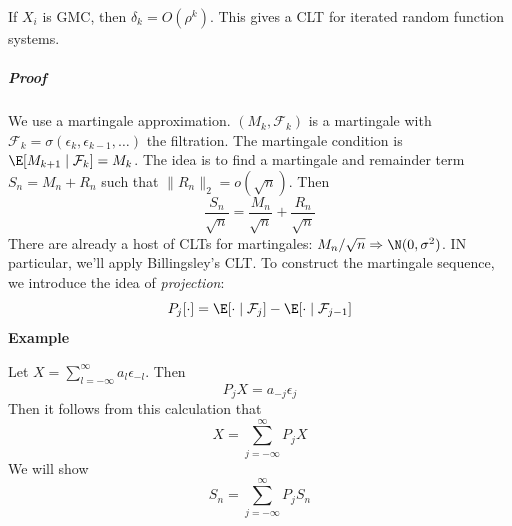 If \(X_i\) is GMC, then \(\delta_k = O(\rho^k)\). This gives a CLT for iterated random function systems.

\subparagraph{Proof}

We use a martingale approximation. \((M_k ,\mathcal F_k)\) is a martingale with \(\mathcal F_k = \sigma(\epsilon_k, \epsilon_{k-1}, \dots)\) the filtration. The martingale condition is \(\E[M_{k+1} \mid \mathcal F_k] = M_k\). The idea is to find a martingale and remainder term \(S_n = M_n + R_n\) such that \(\|R_n\|_2 = o(\sqrt n)\). Then
\[\frac{S_n}{\sqrt{n}} = \frac{M_n}{\sqrt{n}} + \frac{R_n}{\sqrt{n}}\]
There are already a host of CLTs for martingales: \(M_n / \sqrt{n} \Rightarrow \N(0, \sigma^2)\). IN particular, we'll apply Billingsley's CLT. To construct the martingale sequence, we introduce the idea of \emph{projection}:
\[P_{j}[\cdot] = \E[\cdot \mid \mathcal F_j] - \E[\cdot \mid \mathcal F_{j-1}]\]
\textbf{Example}

Let \(X = \sum_{l = -\infty}^\infty a_l \epsilon_{-l}\). Then
\[P_j X = a_{-j} \epsilon_j\]
Then it follows from this calculation that
\[X = \sum_{j=-\infty}^\infty P_j X\]
We will show
\[S_n = \sum_{j=-\infty}^\infty P_j S_n\]
